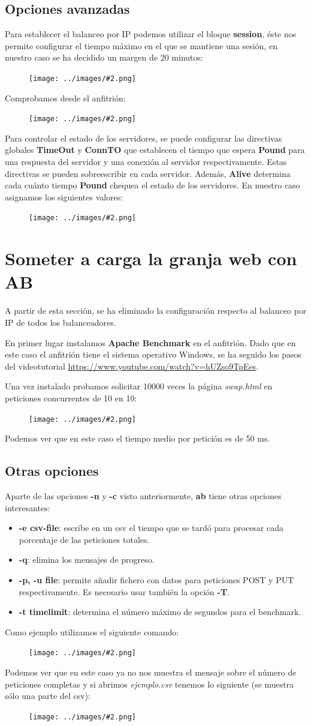 \documentclass[twoside]{article}
\newcommand{\image}[2]{
\begin{figure}[H]
    \texttt{[image: ../images/\#2.png]}
    \centering
\end{figure}
}
\begin{document}
\subsection{Opciones avanzadas}
Para establecer el balanceo por IP podemos utilizar el bloque \textbf{session}, éste nos permite configurar el tiempo máximo en el que se mantiene una sesión, en nuestro caso se ha decidido un margen de 20 minutos:
\image{8}{45}
Comprobamos desde el anfitrión:
\image{8}{46}
Para controlar el estado de los servidores, se puede configurar las directivas globales \textbf{TimeOut} y \textbf{ConnTO} que establecen el tiempo que espera \textbf{Pound} para una respuesta del servidor y una conexión al servidor respectivamente. Estas directivas se pueden sobreescribir en cada servidor. Además, \textbf{Alive} determina cada cuánto tiempo \textbf{Pound} chequea el estado de los servidores. En nuestro caso asignamos los siguientes valores:
\image{6}{47}

\section{Someter a carga la granja web con AB}
A partir de esta sección, se ha eliminado la configuración respecto al balanceo por IP de todos los balanceadores.

En primer lugar instalamos \textbf{Apache Benchmark} en el anfitrión. Dado que en este caso el anfitrión tiene el sistema operativo Windows, se ha seguido los pasos del videotutorial \url{https://www.youtube.com/watch?v=hUZso9TpEes}.

Una vez instalado probamos solicitar 10000 veces la página \textit{swap.html} en peticiones concurrentes de 10 en 10:
\image{8}{48}
Podemos ver que en este caso el tiempo medio por petición es de 50 ms.
\subsection{Otras opciones}
Aparte de las opciones \textbf{-n} y \textbf{-c} visto anteriormente, \textbf{ab} tiene otras opciones interesantes:
\begin{itemize}
    \item \textbf{-e csv-file}: escribe en un csv el tiempo que se tardó para procesar cada porcentaje de las peticiones totales.
    \item \textbf{-q}: elimina los mensajes de progreso.
    \item \textbf{-p, -u file}: permite añadir fichero con datos para peticiones POST y PUT respectivamente. Es necesario usar también la opción \textbf{-T}. 
    \item \textbf{-t timelimit}: determina el número máximo de segundos para el benchmark.
\end{itemize}
Como ejemplo utilizamos el siguiente comando:
\image{8}{49}
Podemos ver que en este caso ya no nos muestra el mensaje sobre el número de peticiones completas y si abrimos \textit{ejemplo.csv} tenemos lo siguiente (se muestra sólo una parte del csv):
\image{6}{50}
\end{document}
